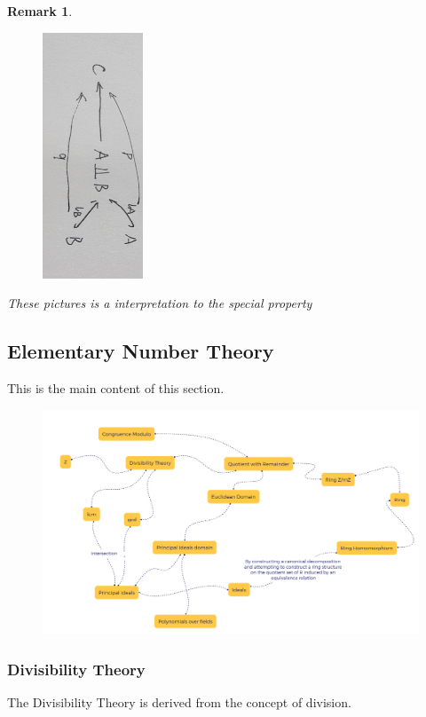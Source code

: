 \documentclass[13pt, a4paper, oneside]{book}
\newtheorem{remark}{Remark}[section]
\begin{document}
\begin{remark}
\begin{figure}[H]
		\end{figure} 
		\begin{figure}[H]
			\centering
			\includegraphics[width = 3cm,angle=90]{Figures/8DCAEE06D322292D4DA355344289906D.png}
		\end{figure}
		These pictures is a interpretation to the special property \\
	\end{remark}
	
	\newpage
	\subsection{Elementary Number Theory}  %
	
	This is the main content of this section. 
	\begin{figure}[H]
		\centering
		\includegraphics[width=15cm]{Figures/QQ20250920-154205.png}
	\end{figure}
	
	\subsubsection{Divisibility Theory}
	The Divisibility Theory is derived from the concept of division.
	
\end{document}
